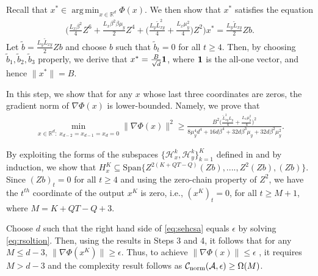 \documentclass{osudissert96}
\DeclareMathOperator*{\argmin}{arg\,min}
\begin{document}
 \vspace{0.1cm}
 Recall that $x^*\in \argmin_{x\in\mathbb{R}^d}\Phi(x)$. We then show that $x^*$ satisfies the equation 
\begin{align*}
\Big (\frac{L_x\beta^2}{4} Z^6 +  \frac{L_x\beta^2\beta\mu_y}{2} Z^4 +\Big (\frac{L_y\widetilde L_{xy}^2}{4}+\frac{L_x\mu_y^2}{4}\Big) Z^2 \Big) x^* =  \frac{L_y\widetilde L_{xy}}{2} Zb. 
\end{align*}
Let $\widetilde b =  \frac{L_y\widetilde L_{xy}}{2} Zb$ and choose $b$  such that $\widetilde b_t=0$ for all $t\geq 4$. Then, by choosing $\widetilde b_1,\widetilde b_2, \widetilde b_3$ properly, we derive that $x^* = \frac{B}{\sqrt{d}} {\bf 1}$, where ${\bf 1}$ is the all-one vector, and hence $\|x^*\|= B$. %

 \vspace{0.1cm}
 In this step, we show that for any $x$ whose last three coordinates are zeros, the gradient norm of $\nabla\Phi(x)$ is lower-bounded. Namely, we prove that 
\begin{align}\label{eq:sehcsa}
\min_{x\in\mathbb{R}^d: \;x_{d-2}=x_{d-1}=x_d=0} \|\nabla\Phi(x)\|^2 \geq \frac{B^2\Big(\frac{\widetilde L^2_{xy}L_y}{4}+\frac{L_x\mu_y^2}{4}\Big)^2}{8\mu_y^4d^4 +16d\beta^4+32d\beta^3\mu_y+32d\beta^2\mu_y^2}.
\end{align}

 \vspace{0.1cm}
 By exploiting the forms of  the subspaces $\{\mathcal{H}_x^k,\mathcal{H}_y^k\}_{k=1}^K$
defined in  and by induction, we show that 
{\small $H_{x}^{K }\subseteq \mbox{Span}\{Z^{2(K+QT-Q)}(Zb),....,Z^2(Zb),(Zb)\}$}.
Since  $(Zb)_t=0$  for all $t\geq 4$ and using the zero-chain property of $Z^2$, we have the $t^{th}$ coordinate of the output $x^K$ is zero, i.e., $(x^K)_{t}=0$,  for all $t\geq M+1$, where $M=K+QT-Q + 3$. 

 \vspace{0.1cm}
 Choose $d$ such that the right hand side of \cref{eq:sehcsa} equals $\epsilon$ by  solving \cref{eq:rsoltion}. Then, using the results in Steps 3 and 4, it follows that for any $M\leq d-3$, $\|\nabla \Phi(x^K)\|\geq \epsilon$. Thus, to achieve $\|\nabla \Phi(x)\|\leq \epsilon$ , it requires $M>d-3$ and the complexity result follows as  $\mathcal{C}_{\text{\normalfont norm}}(\mathcal{A},\epsilon) \geq  \Omega(M)$.
\end{document}
